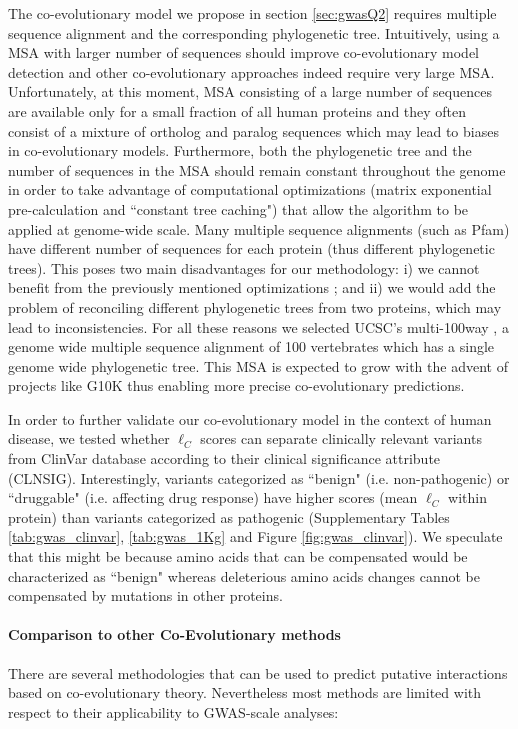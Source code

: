 The co-evolutionary model we propose in section \ref{sec:gwasQ2} requires multiple sequence alignment and the corresponding phylogenetic tree.
Intuitively, using a MSA with larger number of sequences should improve co-evolutionary model detection and other co-evolutionary approaches indeed require very large MSA. 
Unfortunately, at this moment, MSA consisting of a large number of sequences are available only for a small fraction of all human proteins and they often consist of a mixture of ortholog and paralog sequences which may lead to biases in co-evolutionary models. 
Furthermore, both the phylogenetic tree and the number of sequences in the MSA should remain constant throughout the genome in order to take advantage of computational optimizations (matrix exponential pre-calculation and ``constant tree caching") that allow the algorithm to be applied at genome-wide scale. 
Many multiple sequence alignments (such as Pfam) have different number of sequences for each protein (thus different phylogenetic trees). This poses two main disadvantages for our methodology: 
i) we cannot benefit from the previously mentioned optimizations %
; and 
ii) we would add the problem of reconciling different phylogenetic trees from two proteins, which may lead to inconsistencies. 
For all these reasons we selected UCSC's multi-100way \cite{karolchik2014ucsc}, a genome wide multiple sequence alignment of 100 vertebrates which has a single genome wide phylogenetic tree. 
This MSA is expected to grow with the advent of projects like G10K \cite{haussler2009genome} thus enabling more precise co-evolutionary predictions. 

In order to further validate our co-evolutionary model in the context of human disease, we tested whether $\ell_C$ scores can separate clinically relevant variants from ClinVar database \cite{landrum2013clinvar} according to their clinical significance attribute (CLNSIG). 
Interestingly, variants categorized as ``benign" (i.e. non-pathogenic) or ``druggable" (i.e. affecting drug response) have higher scores (mean $\ell_C$ within protein) than variants categorized as pathogenic (Supplementary Tables \ref{tab:gwas_clinvar}, \ref{tab:gwas_1Kg} and Figure \ref{fig:gwas_clinvar}). 
We speculate that this might be because amino acids that can be compensated would be characterized as ``benign" whereas deleterious amino acids changes cannot be compensated by mutations in other proteins. 

\paragraph{Comparison to other Co-Evolutionary methods}
There are several methodologies that can be used to predict putative interactions based on co-evolutionary theory.
Nevertheless most methods are limited with respect to their applicability to GWAS-scale analyses:

